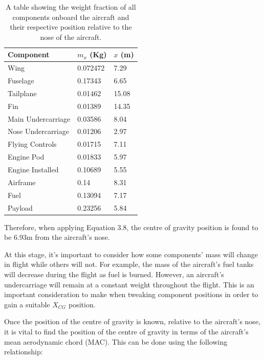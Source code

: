 \documentclass[stu, a4paper, 12pt, floatsintext]{apa7}
\numberwithin{figure}{section}
\numberwithin{table}{section}
\numberwithin{equation}{section}
\begin{document}
\begin{table}[H]
    \centering
    \caption{A table showing the weight fraction of all components onboard the aircraft and their respective position relative to the nose of the aircraft. }
    \label{tab:cg_table}
    \begin{tabular}{@{}lll@{}}
    \toprule
    Component          & $m_x$ (Kg)                      & $x$ (m) \\ \midrule
    Wing               & {\color[HTML]{000000} 0.072472} & 7.29    \\
    Fuselage           & 0.17343                         & 6.65    \\
    Tailplane          & 0.01462                         & 15.08   \\
    Fin                & 0.01389                         & 14.35   \\
    Main Undercarriage & 0.03586                         & 8.04    \\
    Nose Undercarriage & 0.01206                         & 2.97    \\
    Flying Controls    & 0.01715                         & 7.11    \\
    Engine Pod         & 0.01833                         & 5.97    \\
    Engine Installed   & 0.10689                         & 5.55    \\
    Airframe           & 0.14                            & 8.31    \\
    Fuel               & 0.13094                         & 7.17    \\
    Payload            & 0.23256                         & 5.84    \\ \bottomrule
    \end{tabular}
\end{table}

Therefore, when applying Equation 3.8, the centre of gravity position is found to be 6.93m from the aircraft’s nose.

At this stage, it's important to consider how some components' mass will change in flight while others will not. For example, the mass of the aircraft's fuel tanks will decrease during the flight as fuel is burned. However, an aircraft's undercarriage will remain at a constant weight throughout the flight. This is an important consideration to make when tweaking component positions in order to gain a suitable $X_{CG}$ position.

Once the position of the centre of gravity is known, relative to the aircraft’s nose, it is vital to find the position of the centre of gravity in terms of the aircraft’s mean aerodynamic chord (MAC). This can be done using the following relationship:
\end{document}
